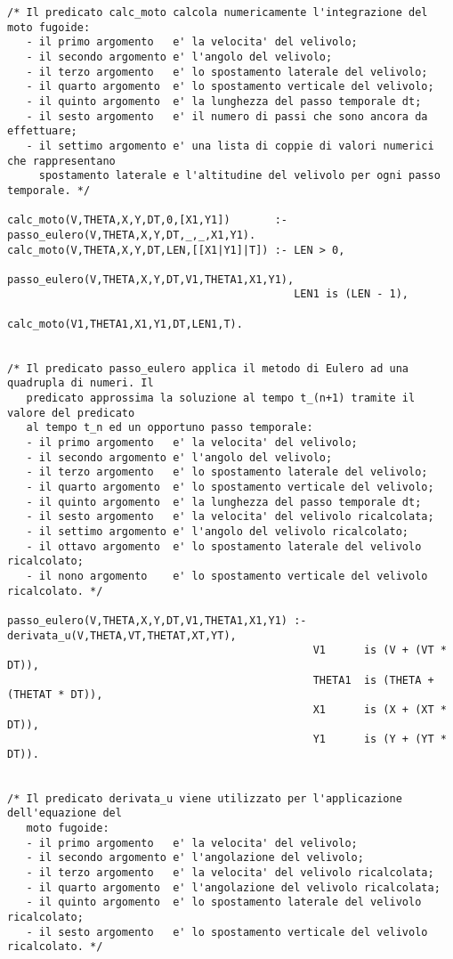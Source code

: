 \begin{verbatim}
/* Il predicato calc_moto calcola numericamente l'integrazione del moto fugoide:
   - il primo argomento   e' la velocita' del velivolo; 
   - il secondo argomento e' l'angolo del velivolo;
   - il terzo argomento   e' lo spostamento laterale del velivolo;
   - il quarto argomento  e' lo spostamento verticale del velivolo;
   - il quinto argomento  e' la lunghezza del passo temporale dt;
   - il sesto argomento   e' il numero di passi che sono ancora da effettuare;
   - il settimo argomento e' una lista di coppie di valori numerici che rappresentano 
     spostamento laterale e l'altitudine del velivolo per ogni passo temporale. */

calc_moto(V,THETA,X,Y,DT,0,[X1,Y1])       :- passo_eulero(V,THETA,X,Y,DT,_,_,X1,Y1).
calc_moto(V,THETA,X,Y,DT,LEN,[[X1|Y1]|T]) :- LEN > 0,
                                             passo_eulero(V,THETA,X,Y,DT,V1,THETA1,X1,Y1),
                                             LEN1 is (LEN - 1),
                                             calc_moto(V1,THETA1,X1,Y1,DT,LEN1,T).


/* Il predicato passo_eulero applica il metodo di Eulero ad una quadrupla di numeri. Il
   predicato approssima la soluzione al tempo t_(n+1) tramite il valore del predicato 
   al tempo t_n ed un opportuno passo temporale: 
   - il primo argomento   e' la velocita' del velivolo; 
   - il secondo argomento e' l'angolo del velivolo;
   - il terzo argomento   e' lo spostamento laterale del velivolo;
   - il quarto argomento  e' lo spostamento verticale del velivolo;
   - il quinto argomento  e' la lunghezza del passo temporale dt;
   - il sesto argomento   e' la velocita' del velivolo ricalcolata; 
   - il settimo argomento e' l'angolo del velivolo ricalcolato;
   - il ottavo argomento  e' lo spostamento laterale del velivolo ricalcolato;
   - il nono argomento    e' lo spostamento verticale del velivolo ricalcolato. */

passo_eulero(V,THETA,X,Y,DT,V1,THETA1,X1,Y1) :- derivata_u(V,THETA,VT,THETAT,XT,YT),
                                                V1      is (V + (VT * DT)),
                                                THETA1  is (THETA + (THETAT * DT)),
                                                X1      is (X + (XT * DT)),
                                                Y1      is (Y + (YT * DT)). 


/* Il predicato derivata_u viene utilizzato per l'applicazione dell'equazione del 
   moto fugoide:
   - il primo argomento   e' la velocita' del velivolo;
   - il secondo argomento e' l'angolazione del velivolo;
   - il terzo argomento   e' la velocita' del velivolo ricalcolata;
   - il quarto argomento  e' l'angolazione del velivolo ricalcolata;
   - il quinto argomento  e' lo spostamento laterale del velivolo ricalcolato;
   - il sesto argomento   e' lo spostamento verticale del velivolo ricalcolato. */


\end{verbatim}
